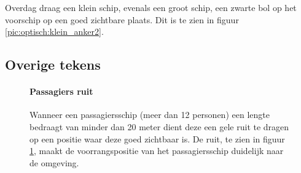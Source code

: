 \vspace{-0.6cm}%
Overdag draag een klein schip, evenals een groot schip, een zwarte bol op het voorschip op een goed zichtbare plaats. Dit is te zien in figuur \ref{pic:optisch:klein_anker2}.


\subsection{Overige tekens}
\label{par:optisch:overig}
\begin{figure}[H]
	\centering
	\begin{minipage}[t]{0.75\textwidth}
		\paragraph{Passagiers ruit}
		Wanneer een passagiersschip (meer dan 12 personen) een lengte bedraagt van minder dan 20 meter dient deze een gele ruit te dragen op een positie waar deze goed zichtbaar is. De ruit, te zien in figuur \ref{pic:optisch:gele_ruit}, maakt de voorrangspositie van het passagiersschip duidelijk naar de omgeving. 
	\end{minipage}
	\hfill
	\begin{minipage}[t]{0.22\textwidth}
		\RemoveLine
		\caption{}
		\label{pic:optisch:gele_ruit}
	\end{minipage}
\end{figure}

